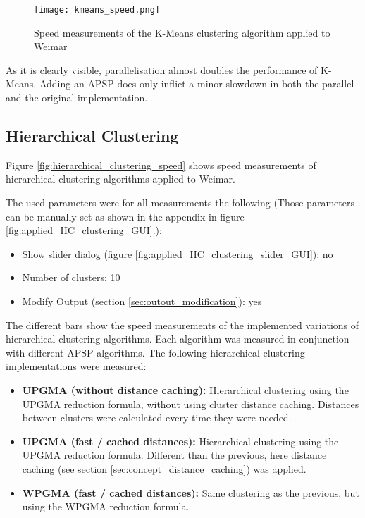 \begin{figure}[!ht]
    \centering
    \begin{mdframed}[style=mdthight]
        \texttt{[image: kmeans\_speed.png]}
    \end{mdframed}
    \caption{Speed measurements of the K-Means clustering algorithm applied to Weimar \label{fig:kmeans_speed}}
\end{figure}

As it is clearly visible, parallelisation almost doubles the performance of K-Means. Adding an \acrshort{APSP} does only inflict a minor slowdown in both the parallel and the original implementation.

\subsection{Hierarchical Clustering}
Figure \ref{fig:hierarchical_clustering_speed} shows speed measurements of hierarchical clustering algorithms applied to Weimar.

The used parameters were for all measurements the following (Those parameters can be manually set as shown in the appendix in figure \ref{fig:applied_HC_clustering_GUI}.):

\begin{itemize}
    \item Show slider dialog (figure \ref{fig:applied_HC_clustering_slider_GUI}): no
    \item Number of clusters: 10
    \item Modify Output (section \ref{sec:outout_modification}): yes
\end{itemize}

The different bars show the speed measurements of the implemented variations of hierarchical clustering algorithms. Each algorithm was measured in conjunction with different \acrshort{APSP} algorithms. The following hierarchical clustering implementations were measured:

\begin{itemize}
    \item \textbf{UPGMA (without distance caching):} Hierarchical clustering using the \acrshort{UPGMA} reduction formula, without using cluster distance caching. Distances between clusters were calculated every time they were needed.
    \item \textbf{UPGMA (fast / cached distances):} Hierarchical clustering using the \acrshort{UPGMA} reduction formula. Different than the previous, here distance caching (see section \ref{sec:concept_distance_caching}) was applied.
    \item \textbf{WPGMA (fast / cached distances):} Same clustering as the previous, but using the \acrshort{WPGMA} reduction formula.
\end{itemize}

